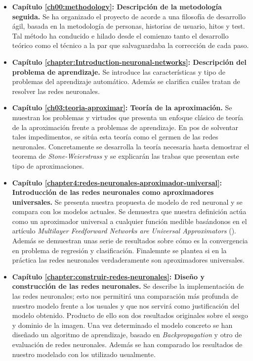 \begin{itemize}
    \item \textbf{Capítulo \ref{ch00:methodology}: Descripción de la metodología seguida.} Se ha organizado el proyecto de acorde a una filosofía de desarrollo ágil, basada en la metodología de personas, historias de usuario, hitos y test. Tal método ha conducido e hilado desde el comienzo tanto el desarrollo teórico como el técnico a la par que  salvaguardaba la corrección de cada paso. 
    \item \textbf{Capítulo \ref{chapter:Introduction-neuronal-networks}: Descripción del problema de aprendizaje.} Se introduce las características y tipo de problemas del aprendizaje automático. Además se clarifica cuáles tratan de resolver las redes neuronales. 
    \item \textbf{Capítulo \ref{ch03:teoria-aproximar}: Teoría de la aproximación.} Se muestran los problemas y virtudes que presenta un enfoque clásico  de teoría de la aproximación frente a problemas de aprendizaje. En pos de solventar tales impedimentos,  
    se sitúa esta teoría como el germen de 
    las redes neuronales.
    Concretamente se desarrolla la teoría necesaria hasta demostrar el teorema de \textit{Stone-Weierstrass} y se explicarán las trabas que presentan este tipo de aproximaciones. 
    \item \textbf{Capítulo \ref{chapter4:redes-neuronales-aproximador-universal}: Introducción de las redes neuronales como aproximadores universales.} Se presenta nuestra propuesta de modelo de red neuronal y se compara con los modelos actuales. Se demuestra que nuestra definición actúa como un aproximador universal a cualquier función medible basándonos en el artículo 
    \textit{Multilayer Feedforward Networks are Universal Approximators} (\cite{HORNIK1989359}). Además se demuestran unas serie de resultados sobre cómo es la convergencia en problema de regresión y clasificación. Finalemnte se plantea si en la práctica las redes neuronales 
    verdaderamente son aproximadores universales.
    \item \textbf{Capítulo \ref{chapter:construir-redes-neuronales}: Diseño y construcción de las redes neuronales.} Se describe la implementación de las redes neuronales; esto nos permitirá una comparación  
    más profunda de nuestro modelo frente a los usuales y que nos servirá como justificación del modelo obtenido. Producto de ello son dos resultados originales sobre el sesgo y dominio de la imagen. 
    Una vez determinado el modelo concreto se
    han diseñado un algoritmo de aprendizaje, basado en \textit{Backpropagation} y otro de evaluación de redes neuronales. Además se han comparado los resultados de nuestro modelado con los utilizado usualmente. 

\end{itemize}
